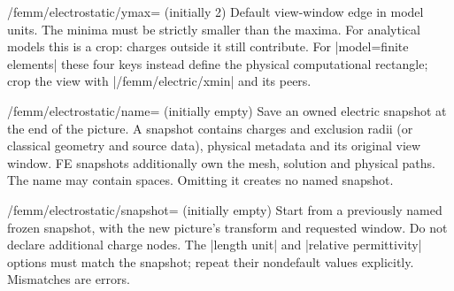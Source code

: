 \begin{key}{/femm/electrostatic/ymax= (initially 2)}
Default view-window edge in model units. The minima must be strictly smaller
than the maxima. For analytical models this is a crop: charges outside it still contribute.
For |model=finite elements| these four keys instead define the physical
computational rectangle; crop the view with |/femm/electric/xmin| and its peers.
\end{key}

\begin{key}{/femm/electrostatic/name= (initially \normalfont empty)}
Save an owned electric snapshot at the end of the picture. A snapshot
contains charges and exclusion radii (or classical geometry and source data),
physical metadata and its original view
window. FE snapshots additionally own the mesh, solution and physical paths. The name may contain spaces. Omitting it creates no named snapshot.
\end{key}

\begin{key}{/femm/electrostatic/snapshot= (initially \normalfont empty)}
Start from a previously named frozen snapshot, with the new picture's
transform and requested window. Do not declare additional charge nodes.
The |length unit| and |relative permittivity| options must match the snapshot;
repeat their nondefault values explicitly. Mismatches are errors.
\end{key}

\begin{codeexample}[width=0pt]
\end{codeexample}


